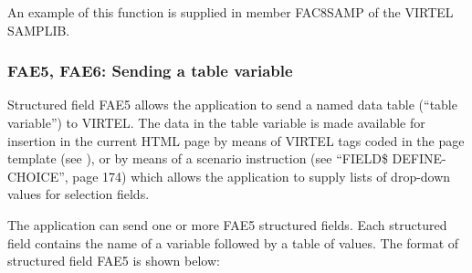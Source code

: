 \documentclass[letterpaper,10pt,english]{sphinxmanual}
\begin{document}

An example of this function is supplied in member FAC8SAMP of the VIRTEL SAMPLIB.


\subsubsection{FAE5, FAE6: Sending a table variable}
\label{\detokenize{User_Guide:fae5-fae6-sending-a-table-variable}}
Structured field FAE5 allows the application to send a named data table (“table variable”) to VIRTEL. The data in the
table variable is made available for insertion in the current HTML page by means of VIRTEL tags coded in the page
template (see {\hyperref[\detokenize{User_Guide:v457ug-table-variables}]{}}), or by means of a scenario instruction (see “FIELD\$ DEFINE-CHOICE”,
page 174) which allows the application to supply lists of drop-down values for selection fields.
\label{\detokenize{User_Guide:v457ug-fae5}}

The application can send one or more FAE5 structured fields. Each structured field contains the name of a variable
followed by a table of values. The format of structured field FAE5 is shown below:

\begin{sphinxVerbatim}[commandchars=\\\{\}]
        
        
       
      
     
    
    
 
\end{sphinxVerbatim}

\end{document}
